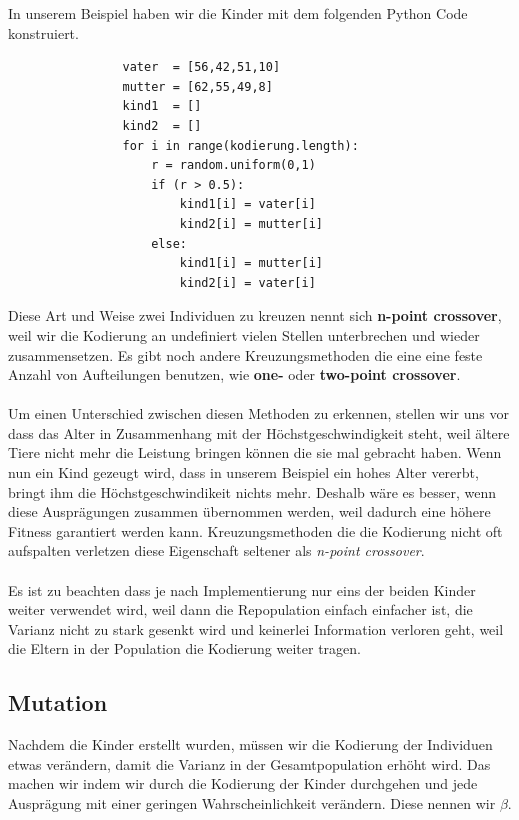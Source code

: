             In unserem Beispiel haben wir die Kinder mit dem folgenden Python Code konstruiert.
            \begin{mdframed}
            \begin{verbatim}
                vater  = [56,42,51,10]
                mutter = [62,55,49,8]
                kind1  = []
                kind2  = []
                for i in range(kodierung.length):
                    r = random.uniform(0,1)
                    if (r > 0.5):
                        kind1[i] = vater[i]
                        kind2[i] = mutter[i]
                    else:
                        kind1[i] = mutter[i]
                        kind2[i] = vater[i]
            \end{verbatim}
            \end{mdframed}
            \noindent
            Diese Art und Weise zwei Individuen zu kreuzen nennt sich \textbf{n-point crossover}, weil wir die Kodierung an undefiniert vielen Stellen unterbrechen und wieder zusammensetzen. Es gibt noch andere Kreuzungsmethoden die eine eine feste Anzahl von Aufteilungen benutzen, wie \textbf{one-} oder \textbf{two-point crossover}. \\
            \\
            \noindent
            Um einen Unterschied zwischen diesen Methoden zu erkennen, stellen wir uns vor dass das Alter in Zusammenhang mit der Höchstgeschwindigkeit steht, weil ältere Tiere nicht mehr die Leistung bringen können die sie mal gebracht haben. Wenn nun ein Kind gezeugt wird, dass in unserem Beispiel ein hohes Alter vererbt, bringt ihm die Höchstgeschwindikeit nichts mehr. Deshalb wäre es besser, wenn diese Ausprägungen zusammen übernommen werden, weil dadurch eine höhere Fitness garantiert werden kann. Kreuzungsmethoden die die Kodierung nicht oft aufspalten verletzen diese Eigenschaft seltener als \textit{n-point crossover}.\\
            \\
            \noindent
            Es ist zu beachten dass je nach Implementierung nur eins der beiden Kinder weiter verwendet wird, weil dann die Repopulation einfach  einfacher ist, die Varianz nicht zu stark gesenkt wird und keinerlei Information verloren geht, weil die Eltern in der Population die Kodierung weiter tragen.


        \subsection{Mutation}
            Nachdem die Kinder erstellt wurden, müssen wir die Kodierung der Individuen etwas verändern, damit die Varianz in der Gesamtpopulation erhöht wird. Das machen wir indem wir durch die Kodierung der Kinder durchgehen und jede Ausprägung mit einer geringen Wahrscheinlichkeit verändern. Diese nennen wir $\beta$.

